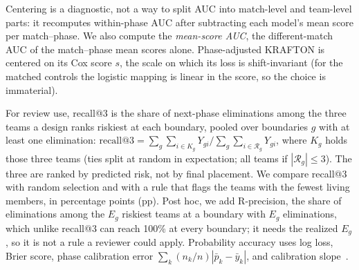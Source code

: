 \documentclass[sigconf,anonymous]{acmart}
\begin{document}
Centering is a diagnostic, not a way to split AUC into match-level and team-level parts: it recomputes within-phase AUC after subtracting each model's mean score per match--phase. We also compute the \emph{mean-score AUC}, the different-match AUC of the match--phase mean scores alone. Phase-adjusted KRAFTON is centered on its Cox score $s$, the scale on which its loss is shift-invariant (for the matched controls the logistic mapping is linear in the score, so the choice is immaterial).

For review use, recall@3 is the share of next-phase eliminations among the three teams a design ranks riskiest at each boundary, pooled over boundaries $g$ with at least one elimination: $\mathrm{recall@3}=\sum_g\sum_{i\in K_g}Y_{gi}\big/\sum_g\sum_{i\in\mathcal{R}_g}Y_{gi}$, where $K_g$ holds those three teams (ties split at random in expectation; all teams if $|\mathcal{R}_g|\le3$). The three are ranked by predicted risk, not by final placement. We compare recall@3 with random selection and with a rule that flags the teams with the fewest living members, in percentage points (pp). Post hoc, we add R-precision, the share of eliminations among the $E_g$ riskiest teams at a boundary with $E_g$ eliminations, which unlike recall@3 can reach 100\% at every boundary; it needs the realized $E_g$, so it is not a rule a reviewer could apply. Probability accuracy uses log loss, Brier score, phase calibration error $\sum_k(n_k/n)|\bar p_k-\bar y_k|$, and calibration slope~\cite{VanCalster16}.
\end{document}
